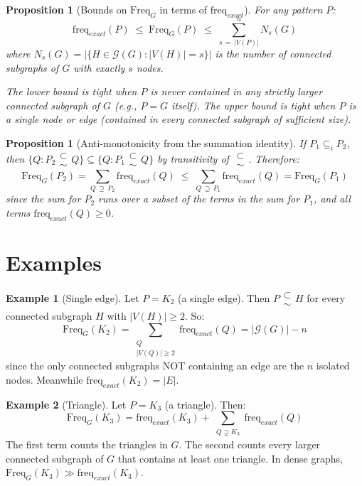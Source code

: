 \documentclass[11pt,a4paper]{article}
\theoremstyle{plain}
\newtheorem{proposition}[theorem]{Proposition}
\theoremstyle{definition}
\newtheorem{example}{Example}
\newcommand{\Freq}{\mathrm{Freq}}
\newcommand{\freq}{\mathrm{freq}}
\newcommand{\GG}{\mathcal{G}}
\newcommand\subsetsim{\mathrel{\substack{
  \textstyle\subset\\[-0.2ex]\textstyle\sim}}}
\begin{document}
\begin{proposition}[Bounds on $\Freq_G$ in terms of $\freq_{exact}$]
\label{prop:bounds}
For any pattern $P$:
\[
\freq_{exact}(P) \;\leq\; \Freq_G(P) \;\leq\; \sum_{s \,=\, |V(P)|}^{n} N_s(G)
\]
where $N_s(G) = |\{H \in \GG(G) : |V(H)| = s\}|$ is the number of connected subgraphs of $G$ with exactly $s$ nodes.

The lower bound is tight when $P$ is never contained in any strictly larger connected subgraph of $G$ (e.g., $P = G$ itself). The upper bound is tight when $P$ is a single node or edge (contained in every connected subgraph of sufficient size).
\end{proposition}

\begin{proposition}[Anti-monotonicity from the summation identity]
If $P_1 \subseteq_i P_2$, then $\{Q : P_2 \subsetsim Q\} \subseteq \{Q : P_1 \subsetsim Q\}$ by transitivity of $\subsetsim$. Therefore:
\[
\Freq_G(P_2) = \sum_{Q \,\supseteq\, P_2} \freq_{exact}(Q) \;\leq\; \sum_{Q \,\supseteq\, P_1} \freq_{exact}(Q) = \Freq_G(P_1)
\]
since the sum for $P_2$ runs over a subset of the terms in the sum for $P_1$, and all terms $\freq_{exact}(Q) \geq 0$.
\end{proposition}

\section{Examples}

\begin{example}[Single edge]
Let $P = K_2$ (a single edge). Then $P \subsetsim H$ for every connected subgraph $H$ with $|V(H)| \geq 2$. So:
\[
\Freq_G(K_2) = \sum_{\substack{Q \\[1pt] |V(Q)| \geq 2}} \freq_{exact}(Q) = |\GG(G)| - n
\]
since the only connected subgraphs NOT containing an edge are the $n$ isolated nodes. Meanwhile $\freq_{exact}(K_2) = |E|$.
\end{example}

\begin{example}[Triangle]
Let $P = K_3$ (a triangle). Then:
\[
\Freq_G(K_3) = \freq_{exact}(K_3) + \sum_{\substack{Q \supsetneq K_3}} \freq_{exact}(Q)
\]
The first term counts the triangles in $G$. The second counts every larger connected subgraph of $G$ that contains at least one triangle. In dense graphs, $\Freq_G(K_3) \gg \freq_{exact}(K_3)$.
\end{example}
\end{document}

